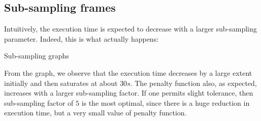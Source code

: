 \documentclass{article}
\begin{document}
\subsection{Sub-sampling frames}
Intuitively, the execution time is expected to decrease with a larger sub-sampling parameter. Indeed, this is what actually happens:
\begin{center}
    Sub-sampling graphs
\end{center}
From the graph, we observe that the execution time decreases by a large extent initially and then saturates at about $30s$. The penalty function also, as expected, increases with a larger sub-sampling factor. If one permits slight tolerance, then sub-sampling factor of $5$ is the most optimal, since there is a huge reduction in execution time, but a very small value of penalty function.
\end{document}
